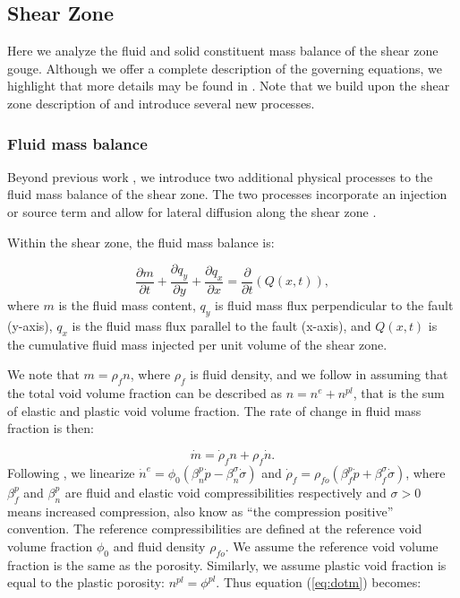 \documentclass[draft]{agujournal2019}
\begin{document}
\subsection{Shear Zone}

Here we analyze the fluid and solid constituent mass balance of the shear zone gouge. Although we offer a complete description of the governing equations, we highlight that more details may be found in . Note that we build upon the shear zone description of  and introduce several new processes. 

\subsubsection{Fluid mass balance} \label{sec:fluid}

Beyond previous work \cite{Heimisson2021}, we introduce two additional physical processes to the fluid mass balance of the shear zone. The two processes incorporate an injection or source term and allow for lateral diffusion along the shear zone .

Within the shear zone, the fluid mass balance is:

\begin{equation}
    \frac{\partial m}{\partial t} + \frac{\partial q_y}{\partial y} + \frac{\partial q_x}{\partial x}  = \frac{\partial}{\partial t} ( Q(x,t) ),
    \label{eq:cons}
\end{equation}
where $m$ is the fluid mass content, $q_y$ is fluid mass flux perpendicular to the fault (y-axis), $q_x$ is the fluid mass flux parallel to the fault (x-axis), and $Q(x,t)$ is the cumulative fluid mass injected per unit volume of the shear zone.

We note that $m =  \rho_f n$, where $\rho_f$ is fluid density, and we follow  in assuming that the total void volume fraction can be described as $n = n^e + n^{pl}$, that is the sum of elastic and plastic void volume fraction. The rate of change in fluid mass fraction is then:

\begin{equation}
    \dot{m} = \dot{\rho}_f n + \rho_f \dot{n}.
    \label{eq:dotm}
\end{equation}
Following , we linearize $\dot{n}^e = \phi_0 (\beta_n^p \dot{p} - \beta_n^{\sigma} \dot{\sigma} )$ and $\dot{\rho}_f = \rho_{fo}(\beta_f^p \dot{p} + \beta_f^\sigma \dot{\sigma} )$, where $\beta_f^p$ and $\beta_n^p$ are fluid and elastic void compressibilities respectively and $\sigma > 0$ means increased compression, also know as ``the compression positive'' convention. The reference compressibilities are defined at the reference void volume fraction $\phi_0$ and fluid density $\rho_{fo}$. We assume the reference void volume fraction is the same as the porosity. Similarly, we assume plastic void fraction is equal to the plastic porosity: $n^{pl} = \phi^{pl}$. Thus equation (\ref{eq:dotm}) becomes: 
\end{document}

